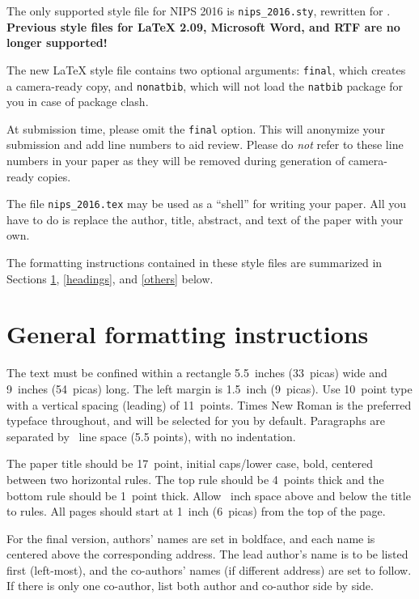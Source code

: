 \documentclass{article}
\begin{document}
The only supported style file for NIPS 2016 is \verb+nips_2016.sty+,
rewritten for \LaTeXe{}.  \textbf{Previous style files for \LaTeX{}
  2.09, Microsoft Word, and RTF are no longer supported!}

The new \LaTeX{} style file contains two optional arguments:
\verb+final+, which creates a camera-ready copy, and \verb+nonatbib+,
which will not load the \verb+natbib+ package for you in case of
package clash.

At submission time, please omit the \verb+final+ option. This will
anonymize your submission and add line numbers to aid review.  Please
do \emph{not} refer to these line numbers in your paper as they will
be removed during generation of camera-ready copies.

The file \verb+nips_2016.tex+ may be used as a ``shell'' for writing
your paper. All you have to do is replace the author, title, abstract,
and text of the paper with your own.

The formatting instructions contained in these style files are
summarized in Sections \ref{gen_inst}, \ref{headings}, and
\ref{others} below.

\section{General formatting instructions}
\label{gen_inst}

The text must be confined within a rectangle 5.5~inches (33~picas)
wide and 9~inches (54~picas) long. The left margin is 1.5~inch
(9~picas).  Use 10~point type with a vertical spacing (leading) of
11~points.  Times New Roman is the preferred typeface throughout, and
will be selected for you by default.  Paragraphs are separated by
~line space (5.5 points), with no indentation.

The paper title should be 17~point, initial caps/lower case, bold,
centered between two horizontal rules. The top rule should be 4~points
thick and the bottom rule should be 1~point thick. Allow
~inch space above and below the title to rules. All
pages should start at 1~inch (6~picas) from the top of the page.

For the final version, authors' names are set in boldface, and each
name is centered above the corresponding address. The lead author's
name is to be listed first (left-most), and the co-authors' names (if
different address) are set to follow. If there is only one co-author,
list both author and co-author side by side.
\end{document}
